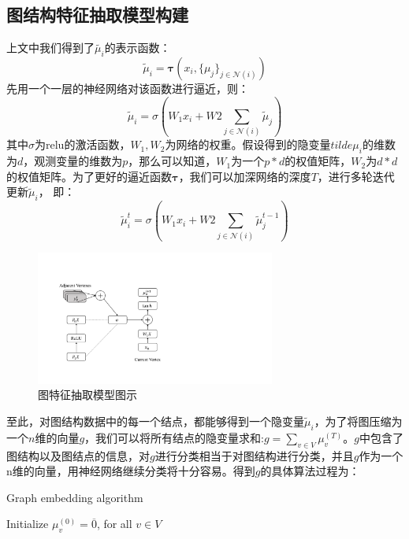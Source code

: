 \subsection{图结构特征抽取模型构建}
上文中我们得到了$\tilde{\mu_i}$的表示函数：
\begin{equation*}
\tilde{\mu}_i = \boldsymbol{\tau} (x_i, \{\mu_j\}_{j\in \mathcal{N}(i)})
\end{equation*}
先用一个一层的神经网络对该函数进行逼近，则：
\begin{equation*}
\tilde{\mu}_i = \sigma(W_1x_i + W2\sum_{j\in \mathcal{N}(i)}\tilde{\mu}_j)
\end{equation*}
其中$\sigma$为relu的激活函数，$W_1, W_2$为网络的权重。假设得到的隐变量$tilde{\mu}_i$的维数为$d$，观测变量的维数为$p$，那么可以知道，$W_1$为一个$p*d$的权值矩阵，$W_2$为$d*d$的权值矩阵。为了更好的逼近函数$\boldsymbol{\tau}$，我们可以加深网络的深度$T$，进行多轮迭代更新$\tilde{\mu}_i$， 即：
\begin{equation*}
\tilde{\mu}_i^t = \sigma(W_1x_i + W2\sum_{j\in \mathcal{N}(i)}\tilde{\mu}_j^{t-1})
\end{equation*}
\begin{figure}[htbp]
\begin{center}
\includegraphics[width=0.7\textwidth]{figures//5.pdf}
\caption{图特征抽取模型图示}
\label{default}
\end{center}
\end{figure}
至此，对图结构数据中的每一个结点，都能够得到一个隐变量$\tilde{\mu}_i$，为了将图压缩为一个$n$维的向量$g$，我们可以将所有结点的隐变量求和:$g =\sum_{v\in V} \mu_v^{(T)}$。$g$中包含了图结构以及图结点的信息，对$g$进行分类相当于对图结构进行分类，并且$g$作为一个n维的向量，用神经网络继续分类将十分容易。得到$g$的具体算法过程为：
 \begin{algorithm}  
        \caption{Graph embedding algorithm}  
            Initialize $\mu_v^{(0)} = \overline{0}$, for all $v \in V$\\
    \end{algorithm}  
